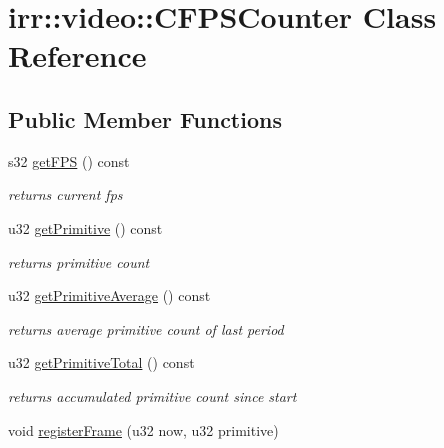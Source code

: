 \hypertarget{classirr_1_1video_1_1_c_f_p_s_counter}{\section{irr\-:\-:video\-:\-:C\-F\-P\-S\-Counter Class Reference}
\label{classirr_1_1video_1_1_c_f_p_s_counter}
}
\subsection*{Public Member Functions}
\begin{DoxyCompactItemize}
\item 
\hypertarget{classirr_1_1video_1_1_c_f_p_s_counter_acb5ee381285a9ed70ae62e57a552fa6b}{s32 \hyperlink{classirr_1_1video_1_1_c_f_p_s_counter_acb5ee381285a9ed70ae62e57a552fa6b}{get\-F\-P\-S} () const }\label{classirr_1_1video_1_1_c_f_p_s_counter_acb5ee381285a9ed70ae62e57a552fa6b}

\begin{DoxyCompactList}\small\item\em returns current fps \end{DoxyCompactList}\item 
u32 \hyperlink{classirr_1_1video_1_1_c_f_p_s_counter_ab532df16f6b0b69f145056c123fe1a04}{get\-Primitive} () const 
\begin{DoxyCompactList}\small\item\em returns primitive count \end{DoxyCompactList}\item 
\hypertarget{classirr_1_1video_1_1_c_f_p_s_counter_a9cded010af74bfa99526a407de89e5a1}{u32 \hyperlink{classirr_1_1video_1_1_c_f_p_s_counter_a9cded010af74bfa99526a407de89e5a1}{get\-Primitive\-Average} () const }\label{classirr_1_1video_1_1_c_f_p_s_counter_a9cded010af74bfa99526a407de89e5a1}

\begin{DoxyCompactList}\small\item\em returns average primitive count of last period \end{DoxyCompactList}\item 
\hypertarget{classirr_1_1video_1_1_c_f_p_s_counter_abd2cbd063ab29f79dd95f1f7fe7fe198}{u32 \hyperlink{classirr_1_1video_1_1_c_f_p_s_counter_abd2cbd063ab29f79dd95f1f7fe7fe198}{get\-Primitive\-Total} () const }\label{classirr_1_1video_1_1_c_f_p_s_counter_abd2cbd063ab29f79dd95f1f7fe7fe198}

\begin{DoxyCompactList}\small\item\em returns accumulated primitive count since start \end{DoxyCompactList}\item 
\hypertarget{classirr_1_1video_1_1_c_f_p_s_counter_a6b1225e5446da7d3a2df43cadcfd7c01}{void \hyperlink{classirr_1_1video_1_1_c_f_p_s_counter_a6b1225e5446da7d3a2df43cadcfd7c01}{register\-Frame} (u32 now, u32 primitive)}\label{classirr_1_1video_1_1_c_f_p_s_counter_a6b1225e5446da7d3a2df43cadcfd7c01}


\end{DoxyCompactItemize}
